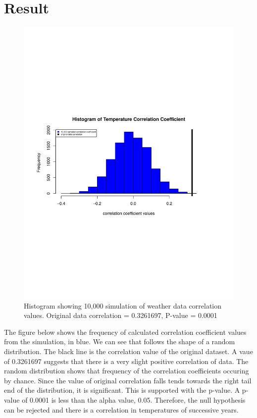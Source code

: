 \documentclass[12pt]{article}
\begin{document}
   \section{Result}
    \begin{figure}[b]
        \includegraphics[scale=0.7]{../Results/TAAutoCorrRplot.pdf}
        \caption{Histogram showing 10,000 simulation of weather data correlation values. Original data correlation = 0.3261697, P-value = 0.0001}
    \end{figure}
    The figure below shows the frequency of calculated correlation coefficient values from the simulation, in blue. We can see that follows the shape of a random distribution. The black line is the correlation value of the original dataset. A vaue of 0.3261697 suggests that there is a very slight positive correlation of data. The random distribution shows that frequency of the correlation coefficients occuring by chance. Since the value of original correlation falls tends towards the right tail end of the distribution, it is significant. This is supported with the p-value. A p-value of 0.0001 is less than the alpha value, 0.05. Therefore, the null hypothesis can be rejected and there is a correlation in temperatures of successive years.
\end{document}
